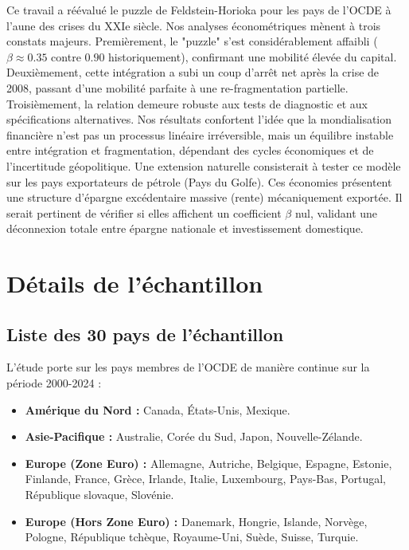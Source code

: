 \documentclass[12pt, a4paper]{article}
\begin{document}
Ce travail a réévalué le puzzle de Feldstein-Horioka pour les pays de l'OCDE à l'aune des crises du XXIe siècle. Nos analyses économétriques mènent à trois constats majeurs. Premièrement, le "puzzle" s'est considérablement affaibli ($\beta \approx 0.35$ contre $0.90$ historiquement), confirmant une mobilité élevée du capital. Deuxièmement, cette intégration a subi un coup d'arrêt net après la crise de 2008, passant d'une mobilité parfaite à une re-fragmentation partielle. Troisièmement, la relation demeure robuste aux tests de diagnostic et aux spécifications alternatives. Nos résultats confortent l’idée que la mondialisation financière n’est pas un processus linéaire irréversible, mais un équilibre instable entre intégration et fragmentation, dépendant des cycles économiques et de l’incertitude géopolitique. Une extension naturelle consisterait à tester ce modèle sur les pays exportateurs de pétrole (Pays du Golfe). Ces économies présentent une structure d'épargne excédentaire massive (rente) mécaniquement exportée. Il serait pertinent de vérifier si elles affichent un coefficient $\beta$ nul, validant une déconnexion totale entre épargne nationale et investissement domestique.
\newpage
\appendix %

\renewcommand{\thesection}{Annexe \Alph{section}} 
\renewcommand{\thesubsection}{\Alph{section}.\arabic{subsection}}

\section{Détails de l'échantillon}
\label{annexe:pays}

\subsection{Liste des 30 pays de l'échantillon}
L'étude porte sur les pays membres de l'OCDE de manière continue sur la période 2000-2024 :

\begin{itemize}
    \item \textbf{Amérique du Nord :} Canada, États-Unis, Mexique.
    \item \textbf{Asie-Pacifique :} Australie, Corée du Sud, Japon, Nouvelle-Zélande.
    \item \textbf{Europe (Zone Euro) :} Allemagne, Autriche, Belgique, Espagne, Estonie, Finlande, France, Grèce, Irlande, Italie, Luxembourg, Pays-Bas, Portugal, République slovaque, Slovénie.
    \item \textbf{Europe (Hors Zone Euro) :} Danemark, Hongrie, Islande, Norvège, Pologne, République tchèque, Royaume-Uni, Suède, Suisse, Turquie.
\end{itemize}
\end{document}
